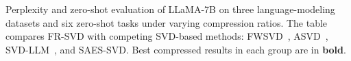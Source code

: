 
\begin{table}[t]
\centering
\footnotesize
\renewcommand{\arraystretch}{1.15}
\setlength{\tabcolsep}{3.2pt}

\caption{Perplexity and zero-shot evaluation of LLaMA-7B on three language-modeling datasets and six zero-shot tasks
under varying compression ratios. The table compares FR-SVD with competing SVD-based
methods: FWSVD~\cite{hsu2022fwsvd}, ASVD~\cite{yuan2023asvd},
SVD-LLM~\cite{wang2025svdllm}, and SAES-SVD.
Best compressed results in each group are in \textbf{bold}.}
\label{tab:main-results}


\end{table}
